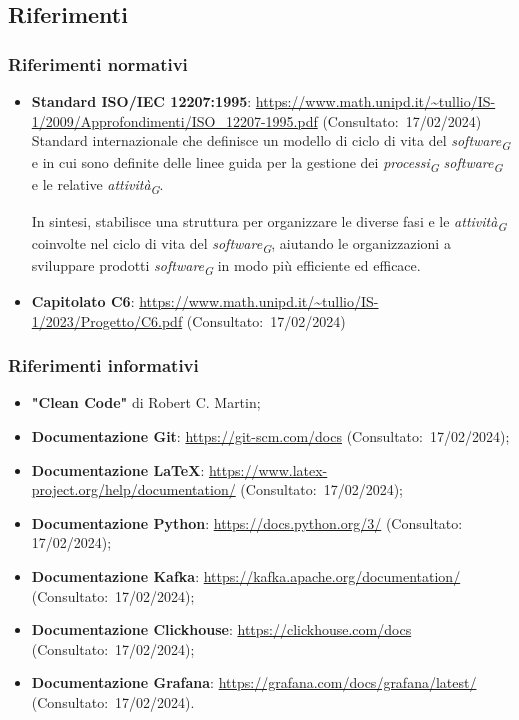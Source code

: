 \subsection{Riferimenti}
\subsubsection{Riferimenti normativi}
\begin{itemize}
    \item \textbf{Standard ISO/IEC 12207:1995}: \url{https://www.math.unipd.it/~tullio/IS-1/2009/Approfondimenti/ISO_12207-1995.pdf} (Consultato:~17/02/2024) \\
    Standard internazionale che definisce un modello di ciclo di vita del \textit{software}\textsubscript{\textit{G}} e in cui sono definite delle linee guida per la gestione dei \textit{processi}\textsubscript{\textit{G}} \textit{software}\textsubscript{\textit{G}} e le relative \textit{attività}\textsubscript{\textit{G}}.
    
    In sintesi, stabilisce una struttura per organizzare le diverse fasi e le \textit{attività}\textsubscript{\textit{G}} coinvolte nel ciclo di vita del \textit{software}\textsubscript{\textit{G}}, aiutando le organizzazioni a sviluppare prodotti \textit{software}\textsubscript{\textit{G}} in modo più efficiente ed efficace.

    \item \textbf{Capitolato C6}: \url{https://www.math.unipd.it/~tullio/IS-1/2023/Progetto/C6.pdf} (Consultato:~17/02/2024)

\end{itemize}

\subsubsection{Riferimenti informativi}
\begin{itemize}
    \item \textbf{"Clean Code"} di Robert C. Martin;
    \item \textbf{Documentazione Git}: \url{https://git-scm.com/docs} (Consultato:~17/02/2024);
    \item \textbf{Documentazione \LaTeX}: \url{https://www.latex-project.org/help/documentation/} (Consultato:~17/02/2024);
    \item \textbf{Documentazione Python}: \url{https://docs.python.org/3/} (Consultato: 17/02/2024);
    \item \textbf{Documentazione Kafka}: \url{https://kafka.apache.org/documentation/} (Consultato:~17/02/2024);
    \item \textbf{Documentazione Clickhouse}: \url{https://clickhouse.com/docs} (Consultato:~17/02/2024);
    \item \textbf{Documentazione Grafana}: \url{https://grafana.com/docs/grafana/latest/} (Consultato:~17/02/2024).
\end{itemize}
